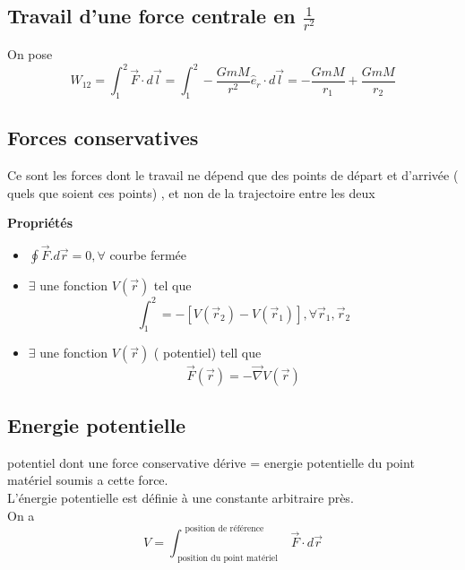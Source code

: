 \documentclass[../main.tex]{subfiles}
\begin{document}
\subsection{Travail d'une force centrale en $\frac{1}{r^{2}}$}
On pose
\[ 
W_{12}= \int_{ 1 }^{ 2 }\vec{F} \cdot d \vec{l} = \int_{ 1 }^{ 2 } - \frac{Gm M}{r^{2}} \hat{e}_r \cdot d \vec{l} = -\frac{GmM}{r_1} + \frac{GmM}{r_2}
\]
\subsection{Forces conservatives}
Ce sont les forces dont le travail ne dépend que des points de départ et d'arrivée ( quels que soient ces points) , et non de la trajectoire entre les deux
\begin{center}
\textbf{Propriétés}
\end{center}
\begin{itemize}
\item $\oint \vec{F} . d \vec{r} = 0, \forall$ courbe fermée
\item $\exists$ une fonction $V( \vec{r}) $ tel que
	\[ 
		\int_{ 1 }^{ 2 } = - [ V ( \vec{r}_2) - V( \vec{r}_1) ] , \forall \vec{r}_1, \vec{r}_2
	\]
	

\item $\exists$ une fonction $V( \vec{r}) $ ( potentiel) tell que
	\[ 
		\vec{F}( \vec{r}) = - \vec{\nabla} V( \vec{r}) 
	\]
\end{itemize}
\subsection{Energie potentielle}
potentiel dont une force conservative dérive = energie potentielle du point matériel soumis a cette force.\\
L'énergie potentielle est définie à une constante arbitraire près.\\

On a 
\[ 
V = \int_{ \text{ position du point matériel }  }^{ \text{ position de référence }  } \vec{F}\cdot d \vec{r}
\]
\end{document}
